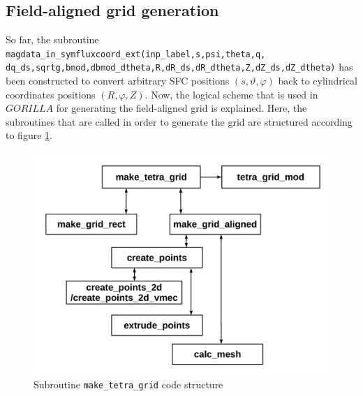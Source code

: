 \documentclass[./main.tex]{subfiles}
\begin{document}
\subsection{Field-aligned grid generation}
So far, the subroutine \texttt{magdata\_in\_symfluxcoord\_ext(inp\_label,s,psi,theta,q,}
\texttt{dq\_ds,sqrtg,bmod,dbmod\_dtheta,R,dR\_ds,dR\_dtheta,Z,dZ\_ds,dZ\_dtheta)} has\\
been constructed to convert arbitrary SFC positions $(s,\vartheta,\varphi)$ back to cylindrical coordinates positions $(R,\varphi,Z)$. Now, the logical scheme that is used in $GORILLA$ for generating the field-aligned grid is explained. Here, the subroutines that are called in order to generate the grid are structured according to figure \ref{fig:make_tetra_grid_code_structure}. 

\begin{figure}[H]
	\includegraphics[width=1.0\textwidth]{figures/make_tetra_grid_graphics.pdf}
	\caption{Subroutine \texttt{make\_tetra\_grid} code structure}
	\label{fig:make_tetra_grid_code_structure}
\end{figure}
\end{document}
